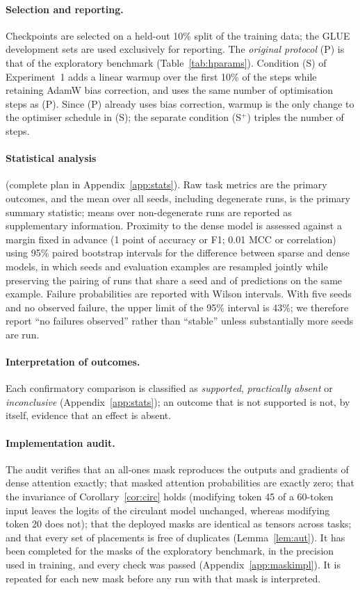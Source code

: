\documentclass[10pt]{article}
\begin{document}
\paragraph{Selection and reporting.} Checkpoints are selected on a held-out 10\% split of the training data; the GLUE development sets are used exclusively for reporting. The \emph{original protocol} (P) is that of the exploratory benchmark (Table~\ref{tab:hparams}). Condition (S) of Experiment~1 adds a linear warmup over the first 10\% of the steps while retaining AdamW bias correction, and uses the same number of optimisation steps as (P). Since (P) already uses bias correction, warmup is the only change to the optimiser schedule in (S); the separate condition (S$^+$) triples the number of steps.

\paragraph{Statistical analysis} (complete plan in Appendix~\ref{app:stats}). Raw task metrics are the primary outcomes, and the mean over all seeds, including degenerate runs, is the primary summary statistic; means over non-degenerate runs are reported as supplementary information. Proximity to the dense model is assessed against a margin fixed in advance (1 point of accuracy or F1; 0.01 MCC or correlation) using 95\% paired bootstrap intervals for the difference between sparse and dense models, in which seeds and evaluation examples are resampled jointly while preserving the pairing of runs that share a seed and of predictions on the same example. Failure probabilities are reported with Wilson intervals. With five seeds and no observed failure, the upper limit of the 95\% interval is 43\%; we therefore report ``no failures observed'' rather than ``stable'' unless substantially more seeds are run.

\paragraph{Interpretation of outcomes.} Each confirmatory comparison is classified as \emph{supported}, \emph{practically absent} or \emph{inconclusive} (Appendix~\ref{app:stats}); an outcome that is not supported is not, by itself, evidence that an effect is absent.

\paragraph{Implementation audit.} The audit verifies that an all-ones mask reproduces the outputs and gradients of dense attention exactly; that masked attention probabilities are exactly zero; that the invariance of Corollary~\ref{cor:circ} holds (modifying token 45 of a 60-token input leaves the logits of the circulant model unchanged, whereas modifying token 20 does not); that the deployed masks are identical as tensors across tasks; and that every set of placements is free of duplicates (Lemma~\ref{lem:aut}). It has been completed for the masks of the exploratory benchmark, in the precision used in training, and every check was passed (Appendix~\ref{app:maskimpl}). It is repeated for each new mask before any run with that mask is interpreted.
\end{document}
